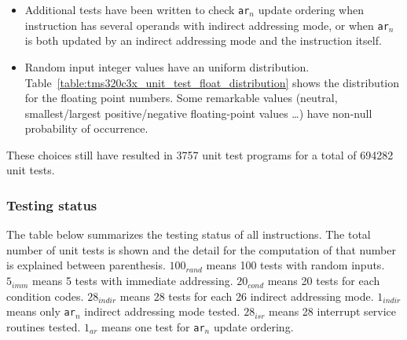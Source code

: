 \begin{itemize}
\item Additional tests have been written to check \texttt{ar$_n$} update ordering when instruction has several operands with indirect addressing mode, or when \texttt{ar$_n$} is both updated by an indirect addressing mode and the instruction itself.
\item Random input integer values have an uniform distribution. Table~\ref{table:tms320c3x_unit_test_float_distribution} shows the distribution for the floating point numbers. Some remarkable values (neutral, smallest/largest positive/negative floating-point values \ldots) have non-null probability of occurrence.
\end{itemize}

These choices still have resulted in 3757 unit test programs for a total of 694282 unit tests.

\subsubsection{Testing status}
\label{tms320c3x_testing_status}

\noindent The table below summarizes the testing status of all instructions. 
The total number of unit tests is shown and the detail for the computation of that number is explained between parenthesis.
$100_{rand}$ means 100 tests with random inputs.
$5_{imm}$ means 5 tests with immediate addressing. 
$20_{cond}$ means 20 tests for each condition codes. 
$28_{indir}$ means 28 tests for each 26 indirect addressing mode. 
$1_{indir}$ means only \texttt{ar$_n$} indirect addressing mode tested. 
$28_{isr}$ means 28 interrupt service routines tested. 
$1_{ar}$ means one test for \texttt{ar$_n$} update ordering.

\newpage


